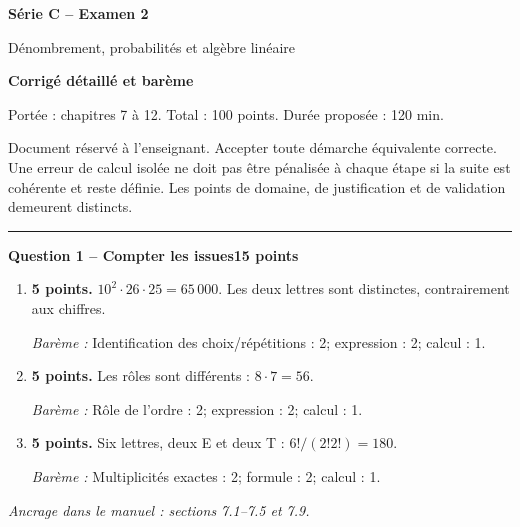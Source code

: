 \documentclass[11pt,a4paper]{article}
\begin{document}
{\LARGE\bfseries Série C -- Examen 2}\par
{\large Dénombrement, probabilités et algèbre linéaire}\par
\textbf{Corrigé détaillé et barème}\par
Portée : chapitres 7 à 12. Total : 100 points. Durée proposée : 120 min.\par
\small Document réservé à l’enseignant. Accepter toute démarche équivalente correcte. Une erreur de calcul isolée ne doit pas être pénalisée à chaque étape si la suite est cohérente et reste définie. Les points de domaine, de justification et de validation demeurent distincts.\normalsize\par
\vspace{3mm}\hrule\vspace{4mm}
{\large\bfseries Question 1 -- Compter les issues}\hfill\textbf{15 points}\par
\begin{enumerate}
\item \textbf{5 points.} \(10^2\cdot26\cdot25=65\,000\). Les deux lettres sont distinctes, contrairement aux chiffres.
\par{\small\textit{Barème : }Identification des choix/répétitions : 2; expression : 2; calcul : 1.}
\item \textbf{5 points.} Les rôles sont différents : \(8\cdot7=56\).
\par{\small\textit{Barème : }Rôle de l’ordre : 2; expression : 2; calcul : 1.}
\item \textbf{5 points.} Six lettres, deux E et deux T : \(6!/(2!2!)=180\).
\par{\small\textit{Barème : }Multiplicités exactes : 2; formule : 2; calcul : 1.}
\end{enumerate}
\vfill {\small\textit{Ancrage dans le manuel : sections 7.1--7.5 et 7.9.}}
\end{document}

